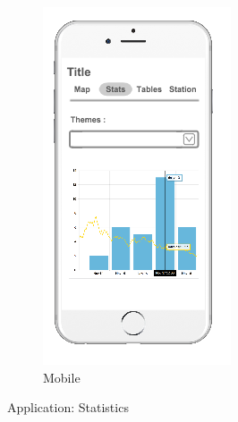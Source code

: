 \begin{figure}[ht]
\begin{subfigure}[b]{0.2\textwidth}
        \includegraphics[width=\textwidth]
          {img/c02-application/png/mobile-website-stats.png}
        \caption{Mobile}
    \end{subfigure}
    \caption{Application: Statistics}
\end{figure}


